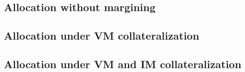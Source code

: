 \documentclass[../Thesis_AHoecherl.tex]{subfiles}
\begin{document}
    \subsection{Allocation without margining}
    \subsection{Allocation under VM collateralization}
    \subsection{Allocation under VM and IM collateralization}
\end{document}
